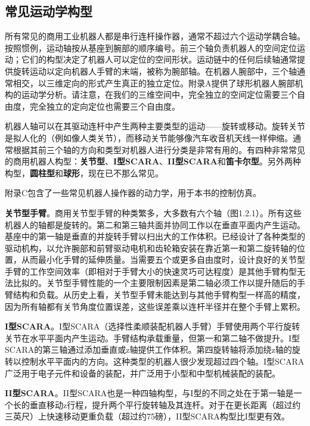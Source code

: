 \documentclass[UTF8,a4paper]{ctexart}
\begin{document}
\subsection{常见运动学构型}

所有常见的商用工业机器人都是串行连杆操作器，通常不超过六个运动学耦合轴。按照惯例，运动轴按从基座到腕部的顺序编号。前三个轴负责机器人的空间定位运动；它们的构型决定了机器人可以定位的空间形状。运动链中的任何后续轴通常提供旋转运动以定向机器人手臂的末端，被称为腕部轴。在机器人腕部中，三个轴通常相交，以三维定向的形式产生真正的独立定位。附录A提供了球形机器人腕部机构的运动学分析。请注意，在我们的三维空间中，完全独立的空间定位需要三个自由度，完全独立的定向定位也需要三个自由度。

机器人轴可以在其驱动连杆中产生两种主要类型的运动——旋转或移动。旋转关节是拟人化的（例如像人类关节），而移动关节能够像汽车收音机天线一样伸缩。通常根据其前三个轴的方向和类型对机器人进行分类是非常有用的。有四种非常常见的商用机器人构型：\textbf{关节型}、\textbf{I型SCARA}、\textbf{II型SCARA}和\textbf{笛卡尔型}。另外两种构型，\textbf{圆柱型}和\textbf{球形}，现在已不那么常见。

附录C包含了一些常见机器人操作器的动力学，用于本书的控制仿真。

\textbf{关节型手臂}。商用关节型手臂的种类繁多，大多数有六个轴（图1.2.1）。所有这些机器人的轴都是旋转的。第二和第三轴共面并协同工作以在垂直平面内产生运动。基座中的第一轴是垂直的并旋转手臂以扫出大的工作体积。已经设计了各种类型的驱动机构，以允许腕部和前臂驱动电机和齿轮箱安装在靠近第一和第二旋转轴的位置，从而最小化手臂的延伸质量。当需要五个或更多自由度时，设计良好的关节型手臂的工作空间效率（即相对于手臂大小的快速灵巧可达程度）是其他手臂构型无法比拟的。关节型手臂性能的一个主要限制因素是第二轴必须工作以提升随后的手臂结构和负载。从历史上看，关节型手臂未能达到与其他手臂构型一样高的精度，因为所有轴都有关节角度位置误差，这些误差乘以连杆半径并在整个手臂上累积。

\textbf{I型SCARA}。I型SCARA（选择性柔顺装配机器人手臂）手臂使用两个平行旋转关节在水平平面内产生运动。手臂结构承载重量，但第一和第二轴不做提升。I型SCARA的第三轴通过添加垂直或z轴提供工作体积。第四旋转轴将添加绕z轴的旋转以控制水平平面内的方向。这种类型的机器人很少发现超过四个轴。I型SCARA广泛用于电子元件和设备的装配，并广泛用于小型和中型机械装配的装配。

\textbf{II型SCARA}。II型SCARA也是一种四轴构型，与I型的不同之处在于第一轴是一个长的垂直移动z行程，提升两个平行旋转轴及其连杆。对于在更长距离（超过约三英尺）上快速移动更重负载（超过约75磅），II型SCARA构型比I型更有效。
\end{document}
